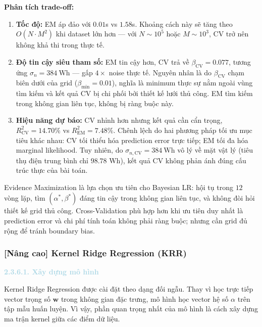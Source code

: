 \textbf{Phân tích trade-off:}
\begin{enumerate}[labelsep=10pt, leftmargin=2cm]
  \item \textbf{Tốc độ:} EM áp đảo với $0.01$s vs $1.58$s.
        Khoảng cách này sẽ tăng theo $O(N \cdot M^2)$ khi dataset lớn hơn ---
        với $N \sim 10^5$ hoặc $M \sim 10^3$, CV trở nên không khả thi trong thực tế.

  \item \textbf{Độ tin cậy siêu tham số:} EM tin cậy hơn,
        CV trả về $\beta_{\text{CV}} = 0.077$, tương ứng $\sigma_n = 384\ \text{Wh}$
        --- gấp $4\times$ noise thực tế. Nguyên nhân là do $\beta_{\text{CV}}$ chạm
        biên dưới của grid ($\beta_{\min} = 0.01$), nghĩa là minimum thực
        sự nằm ngoài vùng tìm kiếm và kết quả CV bị chi phối bởi thiết kế lưới thủ công.
        EM tìm kiếm trong không gian liên tục, không bị ràng buộc này.

  \item \textbf{Hiệu năng dự báo:} CV nhỉnh hơn nhưng kết quả cần cẩn trọng,
        $R^2_{\text{CV}} = 14.70\%$ vs $R^2_{\text{EM}} = 7.48\%$. Chênh lệch do
        hai phương pháp tối ưu mục tiêu khác nhau: CV tối thiểu hóa
        prediction error trực tiếp; EM tối đa hóa marginal likelihood. Tuy nhiên, do $\sigma_{n,\text{CV}} = 384\ \text{Wh}$
        vô lý về mặt vật lý (tiêu thụ điện trung bình chỉ $98.78$ Wh), kết quả CV
        không phản ánh đúng cấu trúc thực của bài toán.
\end{enumerate}

Evidence Maximization là lựa chọn ưu tiên cho Bayesian LR:
hội tụ trong $12$ vòng lặp, tìm $(\alpha^*, \beta^*)$ đáng tin
cậy trong không gian liên tục, và không đòi hỏi thiết kế grid thủ công.
Cross-Validation phù hợp hơn khi ưu tiên duy nhất là prediction error và chi
phí tính toán không phải ràng buộc; nhưng cần grid đủ rộng để tránh boundary bias.

\subsubsection{[Nâng cao] Kernel Ridge Regression (KRR)}

\noindent\textcolor{lightblue}{\textbf{2.3.6.1. Xây dựng mô hình}}

Kernel Ridge Regression được cài đặt theo dạng đối ngẫu. Thay vì học trực tiếp vector trọng số $\mathbf{w}$ trong không gian đặc trưng, mô hình học vector hệ số $\alpha$ trên tập mẫu huấn luyện. Vì vậy, phần quan trọng nhất của mô hình là cách xây dựng ma trận kernel giữa các điểm dữ liệu.

